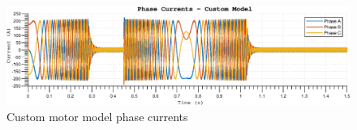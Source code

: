 \begin{figure}[htb]
\begingroup
\tikzset{}
 \centerline{\includegraphics[width=1\columnwidth]{.//Figure/EPS/custom_speedramp_currents.eps}}
 \endgroup
 \caption{Custom motor model phase currents}
 \label{fig:custom_speedramp_current}
\end{figure}